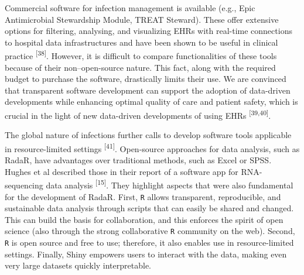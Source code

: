 \documentclass[
]{book}
\begin{document}
Commercial software for infection management is available (e.g., Epic Antimicrobial Stewardship Module, TREAT Steward). These offer extensive options for filtering, analysing, and visualizing EHRs with real-time connections to hospital data infrastructures and have been shown to be useful in clinical practice \textsuperscript{{[}38{]}}. However, it is difficult to compare functionalities of these tools because of their non--open-source nature. This fact, along with the required budget to purchase the software, drastically limits their use. We are convinced that transparent software development can support the adoption of data-driven developments while enhancing optimal quality of care and patient safety, which is crucial in the light of new data-driven developments of using EHRs \textsuperscript{{[}39,40{]}}.

The global nature of infections further calls to develop software tools applicable in resource-limited settings \textsuperscript{{[}41{]}}. Open-source approaches for data analysis, such as RadaR, have advantages over traditional methods, such as Excel or SPSS. Hughes et al described those in their report of a software app for RNA-sequencing data analysis \textsuperscript{{[}15{]}}. They highlight aspects that were also fundamental for the development of RadaR. First, \texttt{R} allows transparent, reproducible, and sustainable data analysis through scripts that can easily be shared and changed. This can build the basis for collaboration, and this enforces the spirit of open science (also through the strong collaborative \texttt{R} community on the web). Second, \texttt{R} is open source and free to use; therefore, it also enables use in resource-limited settings. Finally, Shiny empowers users to interact with the data, making even very large datasets quickly interpretable.
\end{document}
